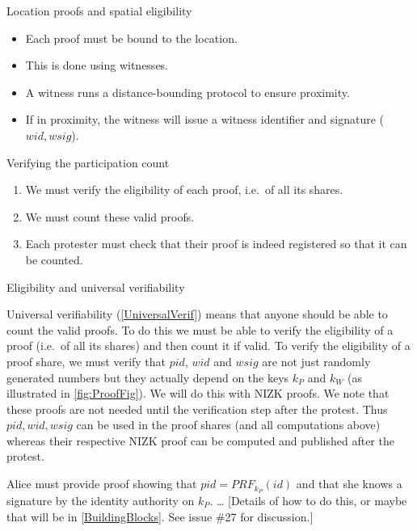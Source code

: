 \begin{columns}[t]
\begin{column}{0.32\linewidth}
    \begin{blackblock}{Location proofs and spatial eligibility}
      \begin{itemize}
        \item Each proof must be bound to the location.
        \item This is done using witnesses.
        \item A witness runs a distance-bounding protocol to ensure proximity.
        \item If in proximity, the witness will issue a witness identifier and 
          signature (\(wid, wsig\)).
      \end{itemize}
    \end{blackblock}

    \begin{blueblock}{Verifying the participation count}
      \begin{enumerate}
        \item We must verify the eligibility of each proof, i.e.\ of all its 
          shares.
        \item We must count these valid proofs.
        \item Each protester must check that their proof is indeed registered so 
          that it can be counted.
      \end{enumerate}
    \end{blueblock}

\begin{blackblock}{Eligibility and universal verifiability}

Universal verifiability (\cref{UniversalVerif}) means that anyone should be able 
to count the valid proofs.
To do this we must be able to verify the eligibility of a proof (i.e.\ of all 
its shares) and then count it if valid.
To verify the eligibility of a proof share, we must verify that \(pid\), \(wid\) 
and \(wsig\) are not just randomly generated numbers but they actually depend on 
the keys \(k_P\) and \(k_W\) (as illustrated in \cref{fig:ProofFig}).
We will do this with \ac{NIZK} proofs.
We note that these proofs are not needed until the verification step after the 
protest.
Thus \(pid, wid, wsig\) can be used in the proof shares (and all computations 
above) whereas their respective \ac{NIZK} proof can be computed and published 
after the protest.

Alice must provide  proof showing that \(pid = PRF_{k_P}(id)\) and 
that she knows a signature by the identity authority on \(k_P\).
\dots
[Details of how to do this, or maybe that will be in \cref{BuildingBlocks}. See 
issue \#27 for discussion.]


\end{blackblock}
\end{column}
\end{columns}
